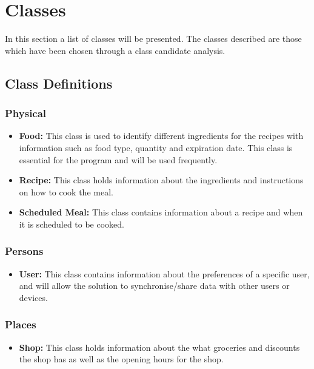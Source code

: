 \section{Classes}\label{ClassesLabel}
In this section a list of classes will be presented. The classes described are those which have been chosen through a class candidate analysis.

\subsection{Class Definitions}

\subsubsection{Physical}
\begin{itemize}
\item \textbf{Food:} This class is used to identify different ingredients for the recipes with information such as food type, quantity and expiration date. This class is essential for the program and will be used frequently.
\item \textbf{Recipe:} This class holds information about the ingredients and instructions on how to cook the meal.
\item \textbf{Scheduled Meal:} This class contains information about a recipe and when it is scheduled to be cooked.
\end{itemize}

\subsubsection{Persons}
\begin{itemize}
\item \textbf{User:} This class contains information about the preferences of a specific user, and will allow the solution to synchronise/share data with other users or devices.
\end{itemize}

\subsubsection{Places}
\begin{itemize}
\item \textbf{Shop:} This class holds information about the what groceries and discounts the shop has as well as the opening hours for the shop.
\end{itemize}

